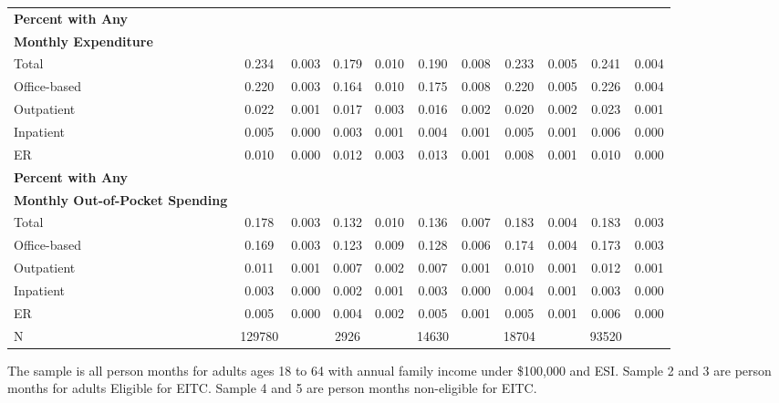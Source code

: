 \documentclass[smallcondensed,referee]{svjour3}
\begin{document}
\begin{table}[h!]
\begin{tabular}{l cccccccccc}
\textbf{Percent with Any} &&&&&&&&\\
\textbf{Monthly Expenditure} &&&&&&&&\\
Total &       0.234&       0.003&       0.179&       0.010&       0.190&       0.008&       0.233&       0.005&       0.241&       0.004\\
Office-based &       0.220&       0.003&       0.164&       0.010&       0.175&       0.008&       0.220&       0.005&       0.226&       0.004\\
Outpatient&       0.022&       0.001&       0.017&       0.003&       0.016&       0.002&       0.020&       0.002&       0.023&       0.001\\
Inpatient&       0.005&       0.000&       0.003&       0.001&       0.004&       0.001&       0.005&       0.001&       0.006&       0.000\\
ER&       0.010&       0.000&       0.012&       0.003&       0.013&       0.001&       0.008&       0.001&       0.010&       0.000\\
\textbf{Percent with Any} &&&&&&&&\\
\textbf{Monthly Out-of-Pocket  Spending} &&&&&&&&\\
Total &       0.178&       0.003&       0.132&       0.010&       0.136&       0.007&       0.183&       0.004&       0.183&       0.003\\
Office-based &       0.169&       0.003&       0.123&       0.009&       0.128&       0.006&       0.174&       0.004&       0.173&       0.003\\
Outpatient &       0.011&       0.001&       0.007&       0.002&       0.007&       0.001&       0.010&       0.001&       0.012&       0.001\\
Inpatient&       0.003&       0.000&       0.002&       0.001&       0.003&       0.000&       0.004&       0.001&       0.003&       0.000\\
ER &       0.005&       0.000&       0.004&       0.002&       0.005&       0.001&       0.005&       0.001&       0.006&       0.000\\
\hline
N             &      129780&            &        2926&            &       14630&            &       18704&            &       93520&            \\
\end{tabular}

	\begin{minipage}{15cm}
		\footnotesize
The sample is all person months for adults ages 18 to 64 with annual family income under \$100,000 and ESI. Sample 2 and 3 are person months for adults Eligible for EITC. Sample 4 and 5 are person months non-eligible for EITC. 
	\end{minipage}
\end{table}
\end{document}
